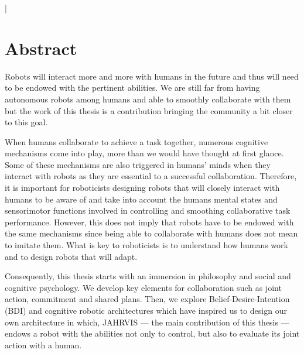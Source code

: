 \documentclass[english,a4paper,11pt,twoside]{StyleThese}
\begin{document}
\lstMakeShortInline[columns=fixed,breaklines=false]|
\makeflyleaf

\cleardoublepage

\dominitoc


 \cleardoublepage


\chapter*{Abstract}

Robots will interact more and more with humans in the future and thus will need to be endowed with the pertinent abilities. We are still far from having autonomous robots among humans and able to smoothly collaborate with them but the work of this thesis is a contribution bringing the community a bit closer to this goal. 


When humans collaborate to achieve a task together, numerous cognitive mechanisms come into play, more than we would have thought at first glance. Some of these mechanisms are also triggered in humans’ minds when they interact with robots as they are essential to a successful collaboration. Therefore, it is important for roboticists designing robots that will closely interact with humans to be aware of and take into account the humans mental states and sensorimotor functions involved in controlling and smoothing collaborative task performance. However, this does not imply that robots have to be endowed with the same mechanisms since being able to collaborate with humans does not mean to imitate them. What is key to roboticists is to understand how humans work and to design  robots that will adapt. 


Consequently, this thesis starts with an immersion in philosophy and social and cognitive psychology. We develop key elements for collaboration such as joint action, commitment and shared plans. Then, we explore Belief-Desire-Intention (BDI) and cognitive robotic architectures  which have inspired us to design our own architecture in which, JAHRVIS —  the main contribution of this thesis — endows a robot with the abilities not only to control, but also to evaluate its joint action with a human. 
\end{document}
